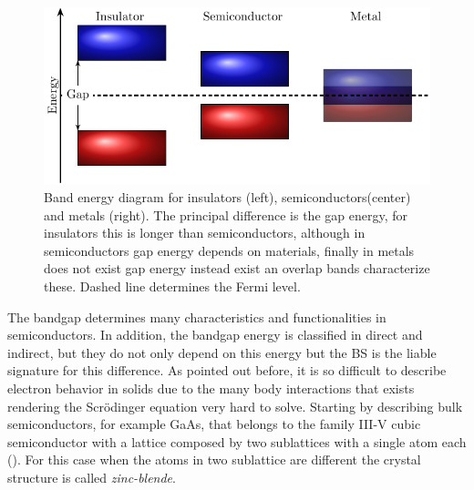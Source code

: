 \begin{figure}[h!]
	\centering
	\includegraphics[width=\linewidth]{../figures/chapter-1/solid-sort/build/solid-sort}
	\caption{Band energy diagram for insulators (left), semiconductors(center) and metals (right). The principal difference is the gap energy, for insulators this is longer than semiconductors, although in semiconductors gap energy depends on materials, finally in metals does not exist gap energy instead exist an overlap bands characterize these. Dashed line determines the Fermi level.}
	\label{fig:subsubsection-1.1.1-solid-types}
\end{figure}

The bandgap determines many characteristics and functionalities in semiconductors. In addition, the bandgap energy is classified in direct and indirect, but they do not only depend on this energy but the \gls{BS} is the liable signature for this difference. As pointed out before, it is so difficult to describe electron behavior in solids due to the many body interactions that exists rendering the Scr\"odinger equation very hard to solve. 
Starting by describing bulk semiconductors, for example GaAs, that belongs to the  family III-V cubic semiconductor with a lattice composed by two sublattices with a single atom each (). For this case when the atoms in two sublattice are different the crystal structure is called \emph{zinc-blende}\cite{vurgaftman2020bands}.

